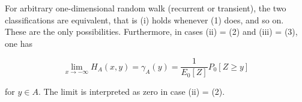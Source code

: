 For arbitrary one-dimensional random walk (recurrent or transient), the two classifications are equivalent, that is (i) holds whenever (1) does, and so on. These are the only possibilities. Furthermore, in cases (ii) = (2) and (iii) = (3), one has

$$\lim_{x \to -\infty} H_A(x,y) = \gamma_A(y) = \frac{1}{E_0[Z]} P_0[Z \geq y]$$

for $y \in A$. The limit is interpreted as zero in case (ii) = (2).